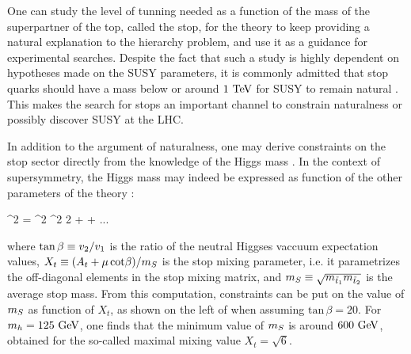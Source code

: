             One can study the level of tunning needed as a function of the mass of the superpartner
            of the top, called the stop, for the theory to keep providing a natural explanation to the hierarchy
            problem, and use it as a guidance for experimental searches. Despite the fact
            that such a study is highly dependent on hypotheses made on the SUSY parameters,
            it is commonly admitted that stop quarks should have a mass below or around $1~\text{TeV}$
            for SUSY to remain natural \cite{TheMoreMinimalSSM, NaturalSusyEndures}. This makes the search for
            stops an important channel to constrain naturalness or possibly discover SUSY
            at the LHC.

            In addition to the argument of naturalness, one may derive constraints on the stop
            sector directly from the knowledge of the Higgs mass \cite{TheLightStopWindow}. In
            the context of supersymmetry, the Higgs mass may indeed be expressed as function
            of the other parameters of the theory :

            {
                ^2
                =
                ^2 ^2 2\beta
                +
                + ...
            }

            where $\text{tan}\, \beta \equiv v_2/v_1$ is the ratio of the neutral
            Higgses vaccuum expectation values,
            $X_t \equiv (A_t + \mu\, \text{cot} \beta) / m_{S}$ is the stop mixing
            parameter, i.e. it parametrizes the off-diagonal elements in the stop mixing
            matrix, and $m_{S} \equiv \sqrt{m_{\tilde{t}_1}m_{\tilde{t}_2}}$ is the average stop
            mass. From this computation, constraints can be put on the value of $m_{S}$ as
            function of $X_t$, as shown on the left of  when assuming $\text{tan}\, \beta
            = 20$. For $m_{h}= 125~\text{GeV}$, one finds that the minimum value of $m_{S}$ is
            around $600~\text{GeV}$, obtained for the so-called maximal mixing value $X_t = \sqrt{6}$.

